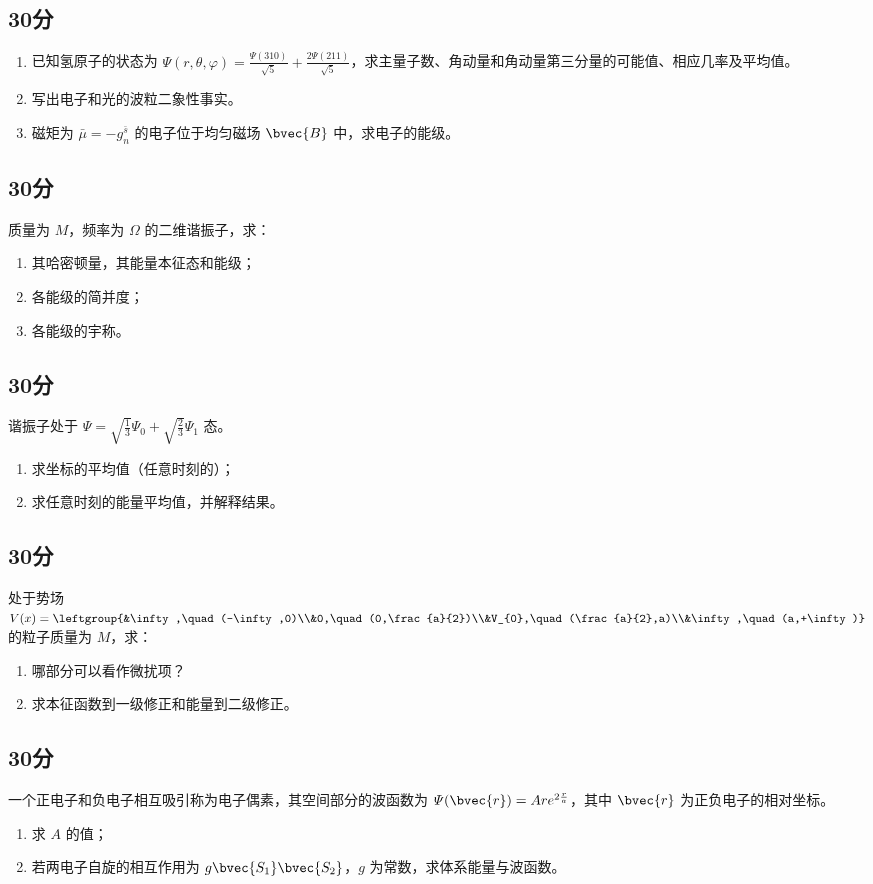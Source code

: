 
\subsection{30分}
\begin{enumerate}
\item 已知氢原子的状态为 $\varPsi (r,\theta,\varphi)=\frac{\varPsi (310)}{\sqrt{5}}+\frac{2\varPsi (211)}{\sqrt{5}}$，求主量子数、角动量和角动量第三分量的可能值、相应几率及平均值。
\item 写出电子和光的波粒二象性事实。
\item 磁矩为 $\bar{\mu}=-g^{\bar{s}}_{n}$ 的电子位于均匀磁场 $\bvec{B}$ 中，求电子的能级。
\end{enumerate}
\subsection{30分}
质量为 $M$，频率为 $\Omega$ 的二维谐振子，求：
\begin{enumerate}
\item 其哈密顿量，其能量本征态和能级；
\item 各能级的简并度；
\item 各能级的宇称。
\end{enumerate}
\subsection{30分}
谐振子处于 $\varPsi =\sqrt{\frac{1}{3}}\varPsi_{0}+\sqrt{\frac{2}{3}}\varPsi_{1}$ 态。
\begin{enumerate}
\item 求坐标的平均值（任意时刻的）；
\item 求任意时刻的能量平均值，并解释结果。
\end{enumerate}
\subsection{30分}
处于势场 $V(x)=\leftgroup{&\infty,\quad (-\infty,0)\\&0,\quad (0,\frac{a}{2})\\&V_{0},\quad (\frac{a}{2},a)\\&\infty,\quad (a,+\infty)}$ 的粒子质量为 $M$，求：
\begin{enumerate}
\item 哪部分可以看作微扰项？
\item 求本征函数到一级修正和能量到二级修正。
\end{enumerate}
\subsection{30分}
一个正电子和负电子相互吸引称为电子偶素，其空间部分的波函数为 $\varPsi (\bvec{r})=Are^{2\frac{r}{a}}$，其中 $\bvec{r}$ 为正负电子的相对坐标。
\begin{enumerate}
\item 求 $A$ 的值；
\item 若两电子自旋的相互作用为 $g\bvec{S_{1}}\bvec{S_{2}}$，$g$ 为常数，求体系能量与波函数。
\end{enumerate}